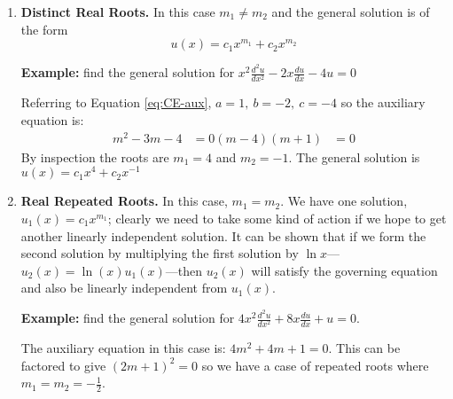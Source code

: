 \begin{enumerate}
\item \textbf{Distinct Real Roots.} In this case $m_1 \ne m_2$ and the general solution is of the form
\begin{equation}
u(x)=c_1x^{m_1}+c_2x^{m_2}
\end{equation}

\vspace{0.5cm}

\noindent\textbf{Example:} find the general solution for $x^2\frac{d^2u}{dx^2}-2x\frac{du}{dx}-4u=0$

\vspace{0.25cm}

\noindent Referring to Equation \ref{eq:CE-aux}, $a=1,\ b=-2, \ c=-4$ so the auxiliary equation is:
\begin{align*}
m^2-3m-4 &= 0
(m-4)(m+1) &=0
\end{align*}
By inspection the roots are $m_1=4$ and $m_2=-1$.  The general solution is $u(x)=c_1x^4+c_2x^{-1}$

\vspace{0.5cm}

\item \textbf{Real Repeated Roots.} In this case, $m_1 = m_2$.  We have one solution, $u_1(x)=c_1x^{m_1}$; clearly we need to take some kind of action if we hope to get another linearly independent solution.  It can be shown that if we form the second solution by multiplying the first solution by $\ln{x}$---$u_2(x)=\ln{(x)}u_1(x)$---then $u_2(x)$ will satisfy the governing equation and also be linearly independent from $u_1(x)$.

\vspace{0.5cm}

\noindent\textbf{Example:} find the general solution for $4x^2 \frac{d^2u}{dx^2}+8x\frac{du}{dx}+u=0$.

\vspace{0.25cm}

\noindent The auxiliary equation in this case is: $4m^2+4m+1=0$.  This can be factored to give $(2m+1)^2=0$ so we have a case of repeated roots where $m_1=m_2=-\frac{1}{2}$.


\end{enumerate}
